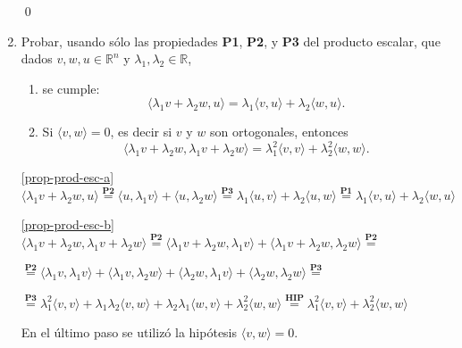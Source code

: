 \begin{enumerate}[topsep=6pt, itemsep=.4cm]
\qed

\item Probar, usando sólo las propiedades \textbf{P1}, \textbf{P2}, y \textbf{P3} del producto escalar, que dados $v, w, u \in \mathbb R^n$ y $\lambda_1, \lambda_2 \in \mathbb R$, 
\begin{enumerate}
    \item\label{prop-prod-esc-a} se cumple:
    \begin{equation*}
    \langle \lambda_1 v + \lambda_2 w , u  \rangle =  \lambda_1\langle v , u  \rangle +   \lambda_2\langle w , u  \rangle.
    \end{equation*}
    \item\label{prop-prod-esc-b}  Si $\langle v , w  \rangle =0$, es decir si $v$ y $w$ son ortogonales,  entonces
    \begin{equation*}
        \langle \lambda_1 v + \lambda_2 w ,  \lambda_1 v + \lambda_2 w   \rangle =
        \lambda_1^2 \langle  v ,  v  \rangle + \lambda_2^2 \langle w,w  \rangle.
    \end{equation*}
\end{enumerate}

\rta 


\noindent\ref{prop-prod-esc-a} $\langle \lambda_1 v + \lambda_2 w , u  \rangle \overset{\textbf{P2}}{=} \langle u , \lambda_1 v \rangle + \langle u , \lambda_2 w \rangle \overset{\textbf{P3}}{=} \lambda_1 \langle u,v \rangle + \lambda_2 \langle u,w \rangle \overset{\textbf{P1}}{=} \lambda_1 \langle v,u \rangle + \lambda_2 \langle w,u \rangle$

\noindent\ref{prop-prod-esc-b} $ \langle \lambda_1 v + \lambda_2 w, \lambda_1 v + \lambda_2 w \rangle \overset{\textbf{P2}}{=} \langle \lambda_1 v + \lambda_2 w, \lambda_1 v \rangle + \langle \lambda_1 v + \lambda_2 w, \lambda_2 w \rangle \overset{\textbf{P2}}{=} $

$ \overset{\textbf{P2}}{=} \langle \lambda_1 v , \lambda_1 v \rangle + \langle \lambda_1 v, \lambda_2 w \rangle + \langle \lambda_2 w, \lambda_1 v \rangle + \langle \lambda_2 w, \lambda_2 w \rangle \overset{\textbf{P3}}{=} $

$ \overset{\textbf{P3}}{=} \lambda_1^2 \langle v , v \rangle + \lambda_1 \lambda_2 \langle v, w \rangle + \lambda_2 \lambda_1 \langle w, v \rangle + \lambda_2^2 \langle w, w \rangle \overset{\textbf{HIP}}{=} \lambda_1^2 \langle v , v \rangle + \lambda_2^2 \langle w, w \rangle $

En el último paso se utilizó la hipótesis $\langle v , w  \rangle =0$.


\end{enumerate}
